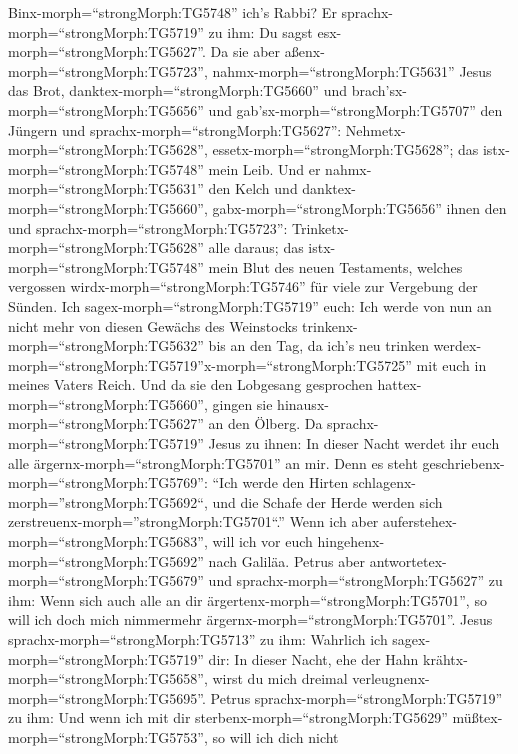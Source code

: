 Binx-morph=``strongMorph:TG5748'' ich's Rabbi? Er
sprachx-morph=``strongMorph:TG5719'' zu ihm: Du sagst
esx-morph=``strongMorph:TG5627''.  Da sie aber
aßenx-morph=``strongMorph:TG5723'', nahmx-morph=``strongMorph:TG5631''
Jesus das Brot, danktex-morph=``strongMorph:TG5660'' und
brach'sx-morph=``strongMorph:TG5656'' und
gab'sx-morph=``strongMorph:TG5707'' den Jüngern und
sprachx-morph=``strongMorph:TG5627'':
Nehmetx-morph=``strongMorph:TG5628'',
essetx-morph=``strongMorph:TG5628''; das
istx-morph=``strongMorph:TG5748'' mein Leib.  Und er
nahmx-morph=``strongMorph:TG5631'' den Kelch und
danktex-morph=``strongMorph:TG5660'', gabx-morph=``strongMorph:TG5656''
ihnen den und sprachx-morph=``strongMorph:TG5723'':
Trinketx-morph=``strongMorph:TG5628'' alle daraus;  das
istx-morph=``strongMorph:TG5748'' mein Blut des neuen Testaments,
welches vergossen wirdx-morph=``strongMorph:TG5746'' für viele zur
Vergebung der Sünden.  Ich
sagex-morph=``strongMorph:TG5719'' euch: Ich werde von nun an nicht mehr
von diesen Gewächs des Weinstocks trinkenx-morph=``strongMorph:TG5632''
bis an den Tag, da ich's neu trinken
werdex-morph=``strongMorph:TG5719''\textbar x-morph=``strongMorph:TG5725''
mit euch in meines Vaters Reich.  Und da sie den Lobgesang
gesprochen hattex-morph=``strongMorph:TG5660'', gingen sie
hinausx-morph=``strongMorph:TG5627'' an den Ölberg.  Da
sprachx-morph=``strongMorph:TG5719'' Jesus zu ihnen: In dieser Nacht
werdet ihr euch alle ärgernx-morph=``strongMorph:TG5701'' an mir. Denn
es steht geschriebenx-morph=``strongMorph:TG5769'': ``Ich werde den
Hirten schlagenx-morph=''strongMorph:TG5692``, und die Schafe der Herde
werden sich zerstreuenx-morph=''strongMorph:TG5701``.'' 
Wenn ich aber auferstehex-morph=``strongMorph:TG5683'', will ich vor
euch hingehenx-morph=``strongMorph:TG5692'' nach Galiläa. 
Petrus aber antwortetex-morph=``strongMorph:TG5679'' und
sprachx-morph=``strongMorph:TG5627'' zu ihm: Wenn sich auch alle an dir
ärgertenx-morph=``strongMorph:TG5701'', so will ich doch mich nimmermehr
ärgernx-morph=``strongMorph:TG5701''.  Jesus
sprachx-morph=``strongMorph:TG5713'' zu ihm: Wahrlich ich
sagex-morph=``strongMorph:TG5719'' dir: In dieser Nacht, ehe der Hahn
krähtx-morph=``strongMorph:TG5658'', wirst du mich dreimal
verleugnenx-morph=``strongMorph:TG5695''.  Petrus
sprachx-morph=``strongMorph:TG5719'' zu ihm: Und wenn ich mit dir
sterbenx-morph=``strongMorph:TG5629''
müßtex-morph=``strongMorph:TG5753'', so will ich dich nicht
